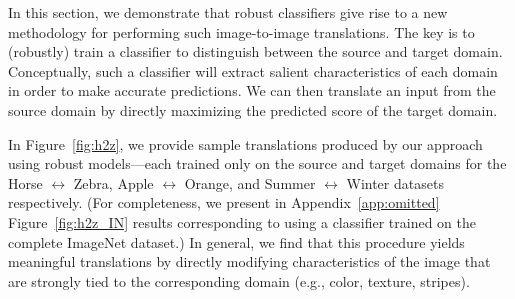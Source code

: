 \documentclass{article}
\newcommand{\HtoZ}{Horse $\leftrightarrow$ Zebra}
\newcommand{\StoW}{Summer $\leftrightarrow$ Winter}
\newcommand{\AtoO}{Apple $\leftrightarrow$ Orange}
\begin{document}
{In this section, we demonstrate that robust classifiers give rise to a new methodology
for performing such image-to-image translations.
The key is  to (robustly) train a classifier to distinguish between
the source and target domain.
Conceptually, such a classifier will extract salient characteristics of each
domain in order to make accurate predictions.
We can then translate an input from the source domain by
directly maximizing the predicted score of the target domain.

In Figure~\ref{fig:h2z}, we provide sample translations produced by our 
approach using robust models---each trained only on the source and 
target domains for the {\HtoZ}, {\AtoO}, and {\StoW} 
datasets~\cite{zhu2017unpaired} respectively. (For completeness,
we present in Appendix~\ref{app:omitted} Figure~\ref{fig:h2z_IN} 
results corresponding to using
a classifier trained on the complete ImageNet dataset.)
In general, we find that this procedure yields meaningful
translations by directly modifying characteristics of the image 
that are strongly tied to the corresponding domain (e.g., color, 
texture, stripes).

\begin{figure}[htp]
    \begin{center}
\end{center}
\end{figure}}
\end{document}
